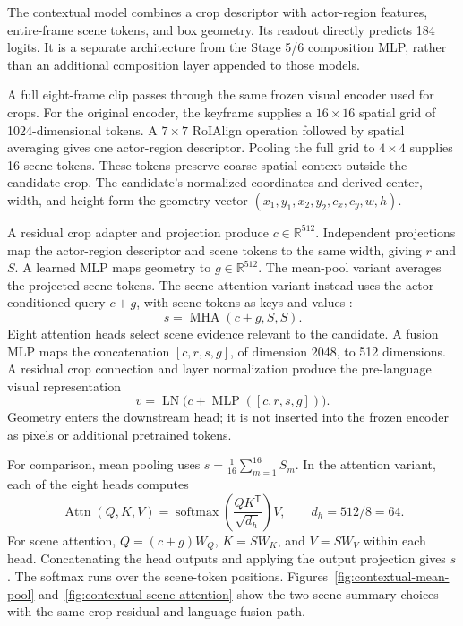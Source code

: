 The contextual model combines a crop descriptor with actor-region features, entire-frame scene tokens, and box geometry. Its readout directly predicts 184 logits. It is a separate architecture from the Stage 5/6 composition MLP, rather than an additional composition layer appended to those models.

A full eight-frame clip passes through the same frozen visual encoder used for crops. For the original encoder, the keyframe supplies a \(16\times16\) spatial grid of 1024-dimensional tokens. A \(7\times7\) RoIAlign operation followed by spatial averaging gives one actor-region descriptor. Pooling the full grid to \(4\times4\) supplies 16 scene tokens. These tokens preserve coarse spatial context outside the candidate crop. The candidate's normalized coordinates and derived center, width, and height form the geometry vector \((x_1,y_1,x_2,y_2,c_x,c_y,w,h)\).

A residual crop adapter and projection produce \(c\in\mathbb{R}^{512}\). Independent projections map the actor-region descriptor and scene tokens to the same width, giving \(r\) and \(S\). A learned MLP maps geometry to \(g\in\mathbb{R}^{512}\). The mean-pool variant averages the projected scene tokens. The scene-attention variant instead uses the actor-conditioned query \(c+g\), with scene tokens as keys and values :
\begin{equation}\label{eq:scene-attention}
 s=\operatorname{MHA}(c+g,S,S).
\end{equation}
Eight attention heads select scene evidence relevant to the candidate. A fusion MLP maps the concatenation \([c,r,s,g]\), of dimension 2048, to 512 dimensions. A residual crop connection and layer normalization produce the pre-language visual representation
\begin{equation}\label{eq:visual-fusion}
 v=\operatorname{LN}\big(c+\operatorname{MLP}([c,r,s,g])\big).
\end{equation}
Geometry enters the downstream head; it is not inserted into the frozen encoder as pixels or additional pretrained tokens.

For comparison, mean pooling uses \(s=\frac{1}{16}\sum_{m=1}^{16}S_m\). In the attention variant, each of the eight heads computes
\begin{equation}\label{eq:attention}
 \operatorname{Attn}(Q,K,V)=\operatorname{softmax}\!\left(\frac{QK^{\mathsf T}}{\sqrt{d_h}}\right)V,
 \qquad d_h=512/8=64.
\end{equation}
For scene attention, \(Q=(c+g)W_Q\), \(K=SW_K\), and \(V=SW_V\) within each head. Concatenating the head outputs and applying the output projection gives \(s\). The softmax runs over the scene-token positions. Figures~\ref{fig:contextual-mean-pool} and~\ref{fig:contextual-scene-attention} show the two scene-summary choices with the same crop residual and language-fusion path.

